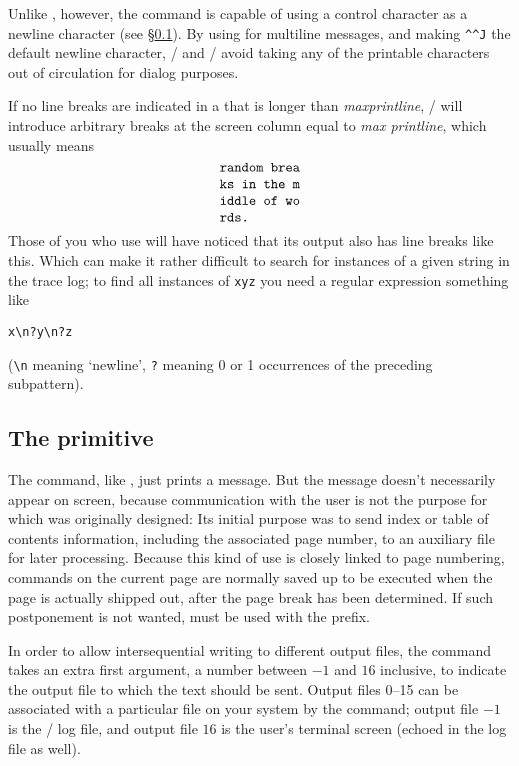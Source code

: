 {Unlike , however, the  command is capable of
using a control character as a newline character (see
\S\ref{ss:write}). By using  for multiline messages, and
making \verb|^^J| the default newline character, \amstex/ and
\latex/ avoid taking any of the printable characters out of
circulation for dialog purposes.

If no line breaks are indicated in a  that is longer than
{\it max\underscore print\underscore line}, \tex/ will introduce
arbitrary breaks at the screen column equal to {\it max\underscore
print\underscore line}, which usually means
 \[\settowidth{\dimen0}{\tt random brea}
\parbox{\dimen0}{\tt
random brea\\
ks in the m\\
iddle of wo\\
rds.}\]
Those of you who use  will have noticed that its
output also has line breaks like this. Which can make it rather
difficult to search for instances of a given string in the trace log;
to find all instances of {\tt xyz} you need a regular expression
something like
\begin{verbatim}
x\n?y\n?z
\end{verbatim}
(\verb'\n' meaning `newline', {\tt?\@} meaning 0 or 1 occurrences of
the preceding subpattern).

\subsection{The  primitive}
\label{ss:write}
The  command, like , just prints a message.  But
the message doesn't necessarily appear on screen, because
communication with the user is not the purpose for which
 was originally designed: Its initial purpose was to send index or
table of contents information, including the associated page number,
to an auxiliary file for later processing. Because this kind of use is
closely linked to page numbering,  commands on the current
page are normally saved up to be executed when the page is actually
shipped out, after the page break has been determined.  If such
postponement is not wanted,  must be used with the
 prefix.

In order to allow intersequential writing to different output files,
the  command takes an extra first argument, a number
between $-1$ and $16$ inclusive, to indicate the output file to which
the text should be sent. Output files 0--15 can be associated with a
particular file on your system by the  command; output
file $-1$ is the \tex/ log file, and output file $16$ is the user's
terminal screen (echoed in the log file as well).

}
